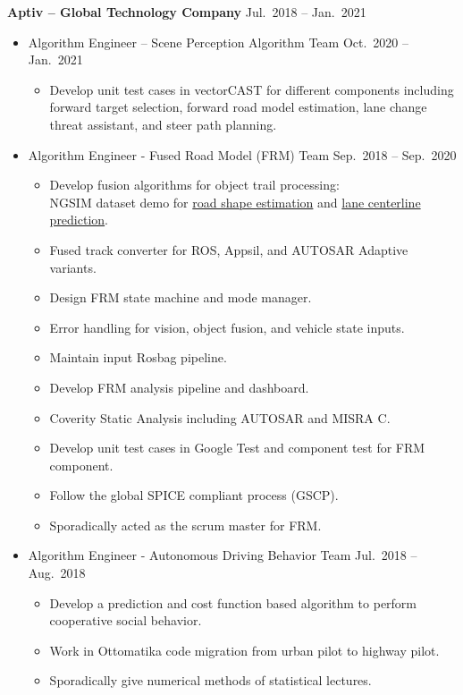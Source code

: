 \documentclass[a4paper,10pt,dvipdfmx]{article}
\def\CC{{C\nolinebreak[4]\hspace{-.05em}\raisebox{.4ex}{\tiny\bf ++}}}
\begin{document}
\textbf{Aptiv -- Global Technology Company} \hfill Jul.~2018 -- Jan.~2021
\begin{itemize}[noitemsep,nolistsep]
	\item[] Algorithm Engineer -- Scene Perception Algorithm Team \hfill Oct.~2020 -- Jan.~2021
    \begin{itemize}[noitemsep,nolistsep]
      \item Develop unit test cases in vectorCAST for different components including forward target selection, forward road model estimation, lane change threat assistant, and steer path planning.
    \end{itemize}
  \item[] Algorithm Engineer - Fused Road Model (FRM) Team \hfill Sep.~2018 -- Sep.~2020
    \begin{itemize}[noitemsep,nolistsep]
      \item Develop fusion algorithms for object trail processing:\\
        NGSIM dataset demo for \href{https://chris7462.github.io/Demo/road_shape_estimation.mp4}{road shape estimation} and \href{https://chris7462.github.io/Demo/lane_centerlines_prediction.mp4}{lane centerline prediction}.
      \item Fused track converter for ROS, Appsil, and AUTOSAR Adaptive variants.
      \item Design FRM state machine and mode manager.
      \item Error handling for vision, object fusion, and vehicle state inputs.
      \item Maintain input Rosbag pipeline.
      \item Develop FRM analysis pipeline and dashboard.
      \item Coverity Static Analysis including AUTOSAR and MISRA \CC.
      \item Develop unit test cases in Google Test and component test for FRM component.
      \item Follow the global SPICE compliant process (GSCP).
      \item Sporadically acted as the scrum master for FRM.
    \end{itemize}
  \item[] Algorithm Engineer - Autonomous Driving Behavior Team \hfill Jul.~2018 -- Aug.~2018
    \begin{itemize}[noitemsep,nolistsep]
      \item Develop a prediction and cost function based algorithm to perform cooperative social behavior.
      \item Work in Ottomatika code migration from urban pilot to highway pilot.
      \item Sporadically give numerical methods of statistical lectures.\\
    \end{itemize}
\end{itemize}
\end{document}
